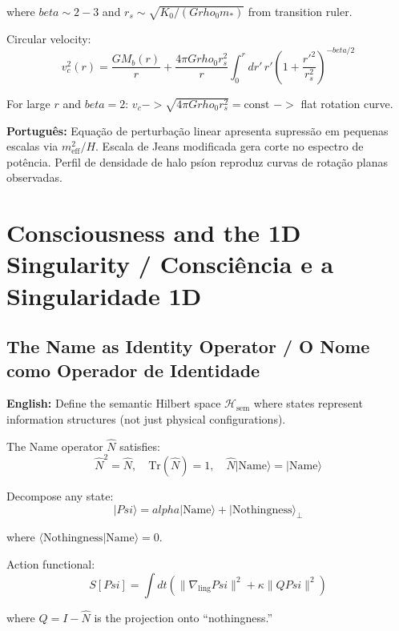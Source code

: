 \documentclass[12pt,a4paper]{article}
\def\Psi{Psi}%
\def\to{ -> }%
\def\alpha{alpha}%
\def\beta{beta}%
\def\rho{rho}%
\begin{document}
where $\beta \sim 2-3$ and $r_s \sim \sqrt{K_0/(G\rho_0 m_*)}$ from transition ruler.

Circular velocity:
\begin{equation}
v_c^2(r) = \frac{GM_b(r)}{r} + \frac{4\pi G\rho_0 r_s^2}{r}\int_0^r dr'\, r'\left(1 + \frac{r'^2}{r_s^2}\right)^{-\beta/2}
\end{equation}

For large $r$ and $\beta = 2$: $v_c \to \sqrt{4\pi G\rho_0 r_s^2} = \text{const}$ $\to$ flat rotation curve.

\textbf{Português:} Equação de perturbação linear apresenta supressão em pequenas escalas via $m_{\text{eff}}^2/H$. Escala de Jeans modificada gera corte no espectro de potência. Perfil de densidade de halo psíon reproduz curvas de rotação planas observadas.

\section{Consciousness and the 1D Singularity / Consciência e a Singularidade 1D}

\subsection{The Name as Identity Operator / O Nome como Operador de Identidade}

\textbf{English:} Define the semantic Hilbert space $\mathcal{H}_{\text{sem}}$ where states represent information structures (not just physical configurations).

The Name operator $\hat{N}$ satisfies:
\begin{equation}
\hat{N}^2 = \hat{N}, \quad \text{Tr}(\hat{N}) = 1, \quad \hat{N}|\text{Name}\rangle = |\text{Name}\rangle
\end{equation}

Decompose any state:
\begin{equation}
|\Psi\rangle = \alpha|\text{Name}\rangle + |\text{Nothingness}\rangle_\perp
\end{equation}

where $\langle\text{Nothingness}|\text{Name}\rangle = 0$.

Action functional:
\begin{equation}
S[\Psi] = \int dt(\|\nabla_{\text{ling}}\Psi\|^2 + \kappa\|Q\Psi\|^2)
\end{equation}

where $Q = I - \hat{N}$ is the projection onto ``nothingness.''
\end{document}
